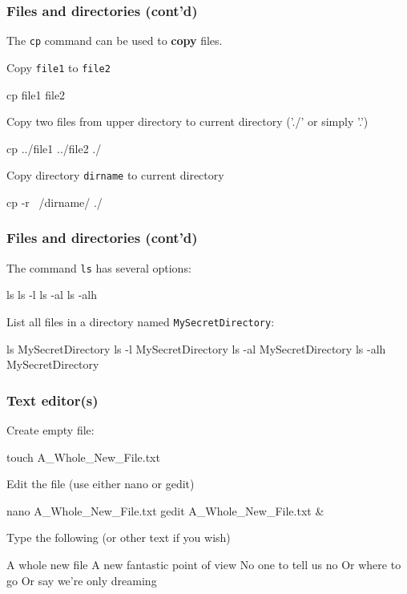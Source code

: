 \documentclass[english,11pt]{beamer}
\begin{document}
\begin{frame}[fragile]
\frametitle{Files and directories (cont'd)}

The \verb|cp| command can be used to \textbf{copy} files.

Copy \verb|file1| to \verb|file2|
\begin{bashcode}
cp file1 file2
\end{bashcode}

Copy two files from upper directory to current directory ('./' or simply '.')
\begin{bashcode}
cp ../file1 ../file2 ./
\end{bashcode}

Copy directory \verb|dirname| to current directory
\begin{bashcode}
cp -r ~/dirname/ ./
\end{bashcode}

\end{frame}


\begin{frame}[fragile]
\frametitle{Files and directories (cont'd)}

The command \verb|ls| has several options:
\begin{bashcode}
ls
ls -l
ls -al
ls -alh
\end{bashcode}

List all files in a directory named \verb|MySecretDirectory|:
\begin{bashcode}
ls MySecretDirectory
ls -l MySecretDirectory
ls -al MySecretDirectory
ls -alh MySecretDirectory
\end{bashcode}

\end{frame}


\begin{frame}[fragile]
\frametitle{Text editor(s)}

Create empty file:
\begin{bashcode}
touch A_Whole_New_File.txt
\end{bashcode}

Edit the file (use either nano or gedit)
\begin{bashcode}
nano A_Whole_New_File.txt
gedit A_Whole_New_File.txt &
\end{bashcode}

Type the following (or other text if you wish)
\begin{bashcode}
A whole new file
A new fantastic point of view
No one to tell us no
Or where to go
Or say we're only dreaming
\end{bashcode}

\end{frame}
\end{document}
